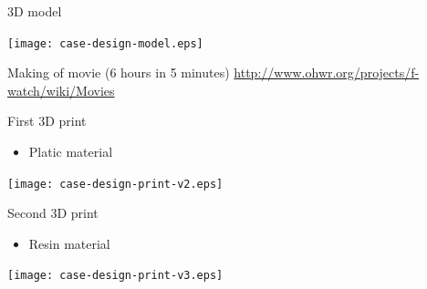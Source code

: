 \documentclass[compress,red]{beamer}
\begin{document}

\begin{frame}{3D model}

  \begin{center}
    \texttt{[image: case-design-model.eps]}
  \end{center}

  Making of movie (6 hours in 5 minutes)
  \url{http://www.ohwr.org/projects/f-watch/wiki/Movies}

  \note[item]{}

\end{frame}

\begin{frame}{First 3D print}

  \begin{itemize}
  \item Platic material
  \end{itemize}

  \begin{center}
    \texttt{[image: case-design-print-v2.eps]}
  \end{center}


\end{frame}

\begin{frame}{Second 3D print}

  \begin{itemize}
  \item Resin material
  \end{itemize}

  \begin{center}
    \texttt{[image: case-design-print-v3.eps]}
  \end{center}


\end{frame}
\end{document}
